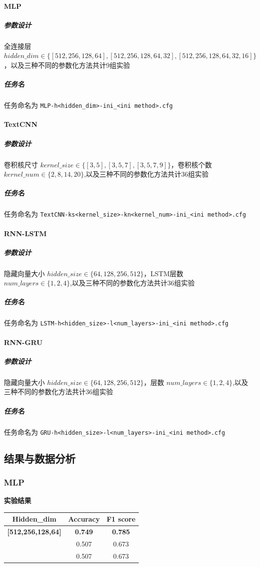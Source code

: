 \documentclass{article}
\begin{document}
\begin{spacing}{1.1}
		\paragraph*{MLP}
		\subparagraph*{参数设计} 全连接层 $hidden\_dim \in \{[512,256,128,64],[512,256,128,64,32],[512,256,128,64,32,16]\}$，以及三种不同的参数化方法共计9组实验 
		\subparagraph*{任务名} 任务命名为 \verb|MLP-h<hidden_dim>-ini_<ini method>.cfg|
		
		\paragraph*{TextCNN}
		\subparagraph*{参数设计} 卷积核尺寸 $kernel\_size \in \{[3,5],[3,5,7],[3,5,7,9]\}$，卷积核个数 $kernel\_num \in \{2,8,14,20\}$,以及三种不同的参数化方法共计36组实验 
		\subparagraph*{任务名} 任务命名为 \verb|TextCNN-ks<kernel_size>-kn<kernel_num>-ini_<ini method>.cfg|
		
		\paragraph*{RNN-LSTM}
		\subparagraph*{参数设计} 隐藏向量大小 $hidden\_size \in \{64,128,256,512\}$，LSTM层数 $num\_layers \in \{1,2,4\}$,以及三种不同的参数化方法共计36组实验 
		\subparagraph*{任务名} 任务命名为 \verb|LSTM-h<hidden_size>-l<num_layers>-ini_<ini method>.cfg|
		
		\paragraph*{RNN-GRU}
		\subparagraph*{参数设计} 隐藏向量大小 $hidden\_size \in \{64,128,256,512\}$，层数 $num\_layers \in \{1,2,4\}$,以及三种不同的参数化方法共计36组实验 
		\subparagraph*{任务名} 任务命名为 \verb|GRU-h<hidden_size>-l<num_layers>-ini_<ini method>.cfg|
		
	\subsection{结果与数据分析}
		\subsubsection{MLP}
			\textbf{实验结果}
			
			\begin{table}[h]
				\center
				\begin{tabular}{c|c|c}
					\textbf{Hidden\_dim} & \textbf{Accuracy} & \textbf{F1 score} \\
					\hline
					\textbf{[512,256,128,64]} & \textbf{0.749} & \textbf{0.785} \\
					\hline
					[512,256,128,64,32]  & 0.507 & 0.673\\
					\hline
					[512,256,128,64,32,16] & 0.507 & 0.673 \\
					

\end{tabular}
\end{table}
\end{spacing}
\end{document}

